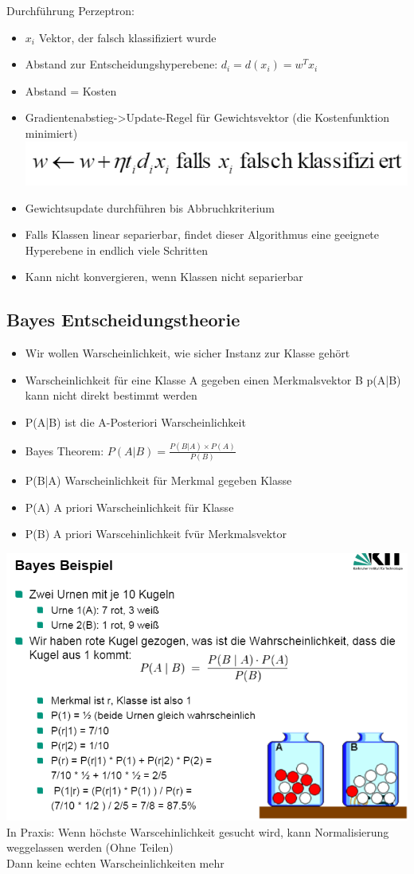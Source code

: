 \documentclass[a4paper,10pt,oneside]{article}
\begin{document}
Durchführung Perzeptron:
\begin{itemize}
	\item $x_i$ Vektor, der falsch klassifiziert wurde
	\item Abstand zur Entscheidungshyperebene: $d_i = d(x_i) = w^Tx_i$
	\item Abstand = Kosten
	\item Gradientenabstieg->Update-Regel für Gewichtsvektor (die Kostenfunktion minimiert)
	\includegraphics[scale=0.65]{Grafiken/perzeptron3.png}
	\item Gewichtsupdate durchführen bis Abbruchkriterium
	\item Falls Klassen linear separierbar, findet dieser Algorithmus eine geeignete Hyperebene in endlich viele Schritten
	\item Kann nicht konvergieren, wenn Klassen nicht separierbar
\end{itemize}

\subsection{Bayes Entscheidungstheorie}
\begin{itemize}
	\item Wir wollen Warscheinlichkeit, wie sicher Instanz zur Klasse gehört
	\item Warscheinlichkeit für eine Klasse A gegeben einen Merkmalsvektor B p(A|B) kann nicht direkt bestimmt werden
	\item P(A|B) ist die A-Posteriori Warscheinlichkeit
	\item Bayes Theorem:
	$P(A|B) = \frac{P(B|A)\times P(A)}{P(B)}$
	\item P(B|A) Warscheinlichkeit für Merkmal gegeben Klasse
	\item P(A) A priori Warscheinlichkeit für Klasse
	\item P(B) A priori Warscehinlichkeit fvür Merkmalsvektor
\end{itemize}
\includegraphics[scale=0.65]{Grafiken/bayes.png}
In Praxis: Wenn höchste Warscehinlichkeit gesucht wird, kann Normalisierung weggelassen werden (Ohne Teilen)\\
Dann keine echten Warscheinlichkeiten mehr
\end{document}
